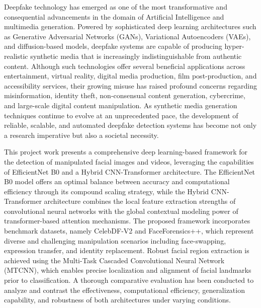 \documentclass[12pt,a4paper]{report}
\begin{document}
Deepfake technology has emerged as one of the most transformative and consequential advancements in the domain of Artificial Intelligence and multimedia generation. Powered by sophisticated deep learning architectures such as Generative Adversarial Networks (GANs), Variational Autoencoders (VAEs), and diffusion-based models, deepfake systems are capable of producing hyper-realistic synthetic media that is increasingly indistinguishable from authentic content. Although such technologies offer several beneficial applications across entertainment, virtual reality, digital media production, film post-production, and accessibility services, their growing misuse has raised profound concerns regarding misinformation, identity theft, non-consensual content generation, cybercrime, and large-scale digital content manipulation. As synthetic media generation techniques continue to evolve at an unprecedented pace, the development of reliable, scalable, and automated deepfake detection systems has become not only a research imperative but also a societal necessity.

This project work presents a comprehensive deep learning-based framework for the detection of manipulated facial images and videos, leveraging the capabilities of EfficientNet B0 and a Hybrid CNN-Transformer architecture. The EfficientNet B0 model offers an optimal balance between accuracy and computational efficiency through its compound scaling strategy, while the Hybrid CNN-Transformer architecture combines the local feature extraction strengths of convolutional neural networks with the global contextual modeling power of transformer-based attention mechanisms. The proposed framework incorporates benchmark datasets, namely CelebDF-V2 and FaceForensics++, which represent diverse and challenging manipulation scenarios including face-swapping, expression transfer, and identity replacement. Robust facial region extraction is achieved using the Multi-Task Cascaded Convolutional Neural Network (MTCNN), which enables precise localization and alignment of facial landmarks prior to classification. A thorough comparative evaluation has been conducted to analyze and contrast the effectiveness, computational efficiency, generalization capability, and robustness of both architectures under varying conditions.


\newpage
{}
\tableofcontents

\newpage
{}
\listoffigures

\newpage
{}
\listoftables
\end{document}
